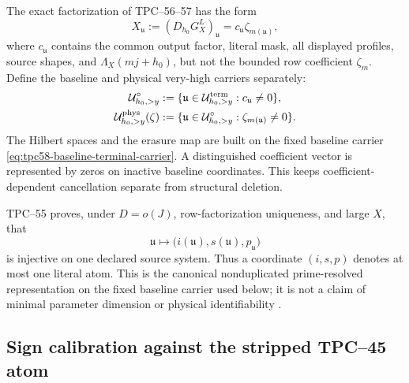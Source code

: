 The exact factorization of TPC--56--57 has the form
\begin{equation}
 X_{\mathfrak u}
 :=(D_{h_0}G_X^L)_{\mathfrak u}
 =c_{\mathfrak u}\zeta_{m(\mathfrak u)},
 \label{eq:tpc58-terminal-row-factorization}
\end{equation}
where \(c_{\mathfrak u}\) contains the common output factor, literal mask,
all displayed profiles, source shapes, and \(\Lambda_X(mj+h_0)\), but not
the bounded row coefficient \(\zeta_m\).  Define the baseline and physical
very-high carriers separately:
\begin{align}
 \mathcal U_{h_0,>y}^{\circ}
 &:=\{\mathfrak u\in\mathcal U_{h_0,>y}^{\rm term}:
                 c_{\mathfrak u}\ne0\},
 \label{eq:tpc58-baseline-terminal-carrier}\\
 \mathcal U_{h_0,>y}^{\rm phys}(\zeta)
 &:=\{\mathfrak u\in\mathcal U_{h_0,>y}^{\circ}:
                 \zeta_{m(\mathfrak u)}\ne0\}.
 \label{eq:tpc58-physical-terminal-carrier}
\end{align}
The Hilbert spaces and the erasure map are built on the fixed baseline
carrier \eqref{eq:tpc58-baseline-terminal-carrier}.  A distinguished
coefficient vector is represented by zeros on inactive baseline
coordinates.  This keeps coefficient-dependent cancellation separate from
structural deletion.

TPC--55 proves, under \(D=o(J)\), row-factorization uniqueness, and large
\(X\), that
\begin{equation}
 \mathfrak u\longmapsto
 \bigl(i(\mathfrak u),s(\mathfrak u),p_{\mathfrak u}\bigr)
 \label{eq:tpc58-prime-resolved-injection}
\end{equation}
is injective on one declared source system.  Thus a coordinate
\((i,s,p)\) denotes at most one literal atom.  This is the canonical
nonduplicated prime-resolved representation on the fixed baseline carrier
used below; it is not a claim of minimal parameter dimension or physical
identifiability \citep{WangTPC55}.

\subsection{Sign calibration against the stripped TPC--45 atom}

